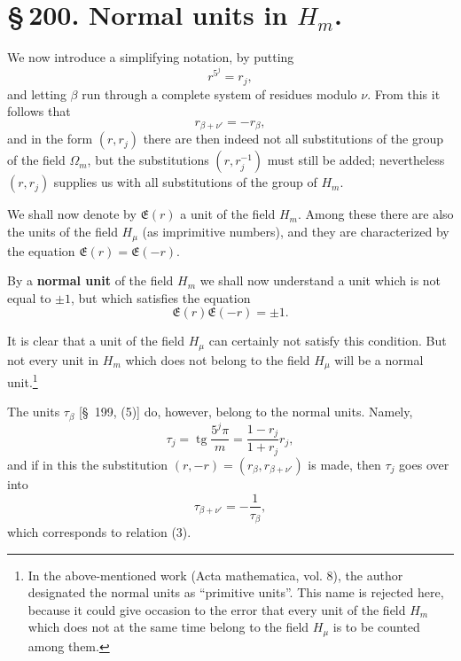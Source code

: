 \documentclass[11pt]{article}
\newcommand{\tg}{\operatorname{tg}}
\begin{document}
\section*{\S\,200. Normal units in $H_m$.}

We now introduce a simplifying notation, by putting
\begin{equation}
r^{5^j}=r_j,
\tag{1}
\end{equation}
and letting $\beta$ run through a complete system of residues modulo $\nu$. From this it follows that
\begin{equation}
r_{\beta+\nu'}=-r_\beta,
\tag{2}
\end{equation}
and in the form $(r,r_j)$ there are then indeed not all substitutions of the group of the field $\Omega_m$, but the substitutions $(r,r_j^{-1})$ must still be added; nevertheless $(r,r_j)$ supplies us with all substitutions of the group of $H_m$.

We shall now denote by $\mathfrak E(r)$ a unit of the field $H_m$. Among these there are also the units of the field $H_\mu$ (as
imprimitive numbers), and they are characterized by the equation $\mathfrak E(r)=\mathfrak E(-r)$.

By a \textbf{normal unit} of the field $H_m$ we shall now understand a unit which is not equal to $\pm1$, but which satisfies the equation
\begin{equation}
\mathfrak E(r)\mathfrak E(-r)=\pm1.
\tag{3}
\end{equation}

It is clear that a unit of the field $H_\mu$ can certainly not satisfy this condition. But not every unit in $H_m$ which does not belong to the field $H_\mu$ will be a normal unit.\footnote{In the above-mentioned work (Acta mathematica, vol. 8), the author designated the normal units as ``primitive units''. This name is rejected here, because it could give occasion to the error that every unit of the field $H_m$ which does not at the same time belong to the field $H_\mu$ is to be counted among them.}

The units $\tau_\beta$ [\S~199, (5)] do, however, belong to the normal units. Namely,
\begin{equation}
\tau_j=\tg\frac{5^j\pi}{m}=\frac{1-r_j}{1+r_j}r_j,
\tag{4}
\end{equation}
and if in this the substitution $(r,-r)=(r_\beta,r_{\beta+\nu'})$ is made, then $\tau_j$ goes over into
\begin{equation}
\tau_{\beta+\nu'}=-\frac1{\tau_\beta},
\tag{5}
\end{equation}
which corresponds to relation (3).
\end{document}
